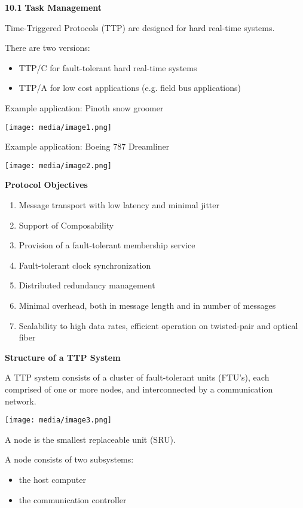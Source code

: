 \textbf{10.1} \protect\hypertarget{teil2}{}{}\textbf{Task Management}

Time-Triggered Protocols (TTP) are designed for hard real-time systems.

There are two versions:

\begin{itemize}
\item
  TTP/C for fault-tolerant hard real-time systems
\item
  TTP/A for low cost applications (e.g. field bus applications)
\end{itemize}

Example application: Pinoth snow groomer

\texttt{[image: media/image1.png]}

Example application: Boeing 787 Dreamliner

\texttt{[image: media/image2.png]}

\textbf{Protocol Objectives}

\begin{enumerate}
\def\labelenumi{\arabic{enumi}.}
\item
  Message transport with low latency and minimal jitter
\item
  Support of Composability
\item
  Provision of a fault-tolerant membership service
\item
  Fault-tolerant clock synchronization
\item
  Distributed redundancy management
\item
  Minimal overhead, both in message length and in number of messages
\item
  Scalability to high data rates, efficient operation on twisted-pair
  and optical fiber
\end{enumerate}

\textbf{Structure of a TTP System}

A TTP system consists of a cluster of fault-tolerant units (FTU's), each
comprised of one or more nodes, and interconnected by a communication
network.

\texttt{[image: media/image3.png]}

A node is the smallest replaceable unit (SRU).

A node consists of two subsystems:

\begin{itemize}
\item
  the host computer
\item
  the communication controller
\end{itemize}

